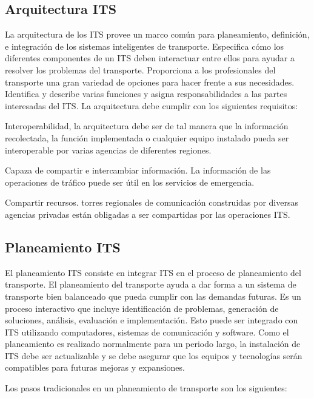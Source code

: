\subsection{Arquitectura ITS}

La arquitectura de los ITS provee un marco común para planeamiento, definición, e integración de los sistemas inteligentes de transporte. Especifica cómo los diferentes componentes de un ITS deben interactuar entre ellos para ayudar a resolver los problemas del transporte. Proporciona a los profesionales del transporte una gran variedad de opciones para hacer frente a sus necesidades. Identifica y describe varias funciones y asigna responsabilidades a las partes interesadas del ITS. La arquitectura debe cumplir con los siguientes requisitos:

Interoperabilidad, la arquitectura debe ser de tal manera que la información recolectada, la función implementada o cualquier equipo instalado pueda ser interoperable por varias agencias de diferentes regiones.

Capaza de compartir e intercambiar información. La información de las operaciones de tráfico puede ser útil en los servicios de emergencia.

Compartir recursos. torres regionales de comunicación construidas por diversas agencias privadas están obligadas a ser compartidas por las operaciones ITS.

\subsection{Planeamiento ITS}

El planeamiento ITS consiste en integrar ITS en el proceso de planeamiento del transporte. El planeamiento del transporte ayuda a dar forma a un sistema de transporte bien balanceado que pueda cumplir con las demandas futuras. Es un proceso interactivo que incluye identificación de problemas, generación de soluciones, análisis, evaluación e implementación. Esto puede ser integrado con ITS utilizando computadores, sistemas de comunicación y software. Como el planeamiento es realizado normalmente para un periodo largo, la instalación de ITS debe ser actualizable y se debe asegurar que los equipos y tecnologías serán compatibles para futuras mejoras y expansiones.

Los pasos tradicionales en un planeamiento de transporte son los siguientes:

